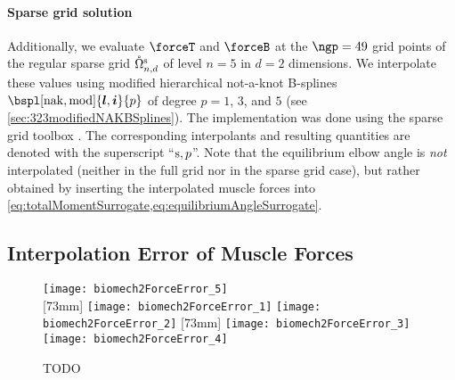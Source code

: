 \paragraph{Sparse grid solution}

Additionally, we evaluate $\forceT$ and $\forceB$ at the $\ngp = 49$
grid points of the regular sparse grid $\interiorregsgset{n}{d}$ of
level $n = 5$ in $d = 2$ dimensions.
We interpolate these values using
modified hierarchical not-a-knot B-splines
$\bspl[\nak,\modified]{\*l,\*i}{p}$ of degree $p = 1$, $3$, and $5$
(see \cref{sec:323modifiedNAKBSplines}).
The implementation was done using the sparse grid toolbox
\sgpp{} \cite{Pflueger10Spatially}.
The corresponding interpolants and resulting quantities
are denoted with the superscript ``$\mathrm{s},p$''.
Note that the equilibrium elbow angle is \emph{not} interpolated
(neither in the full grid nor in the sparse grid case),
but rather obtained by inserting the interpolated muscle forces
into \cref{eq:totalMomentSurrogate,eq:equilibriumAngleSurrogate}.



\subsection{Interpolation Error of Muscle Forces}
\label{sec:732forceInterpolation}

\dummytext[3]{}

\begin{figure}
  \texttt{[image: biomech2ForceError\_5]}%
  \\[2mm]%
  [73mm]{%
    \texttt{[image: biomech2ForceError\_1]}%
    \hfill%
    \texttt{[image: biomech2ForceError\_2]}%
  }%
  \hfill%
  [73mm]{%
    \texttt{[image: biomech2ForceError\_3]}%
    \hfill%
    \texttt{[image: biomech2ForceError\_4]}%
  }%
  \caption[TODO]{%
    TODO%
  }%
  \label{fig:TODO}%
\end{figure}

